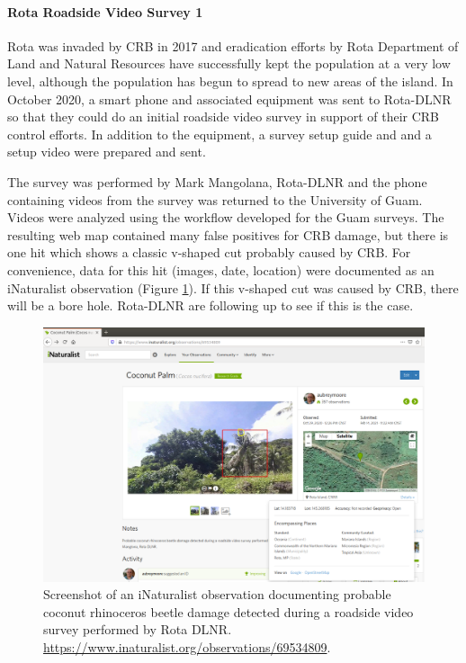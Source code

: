 \documentclass[12pt,letterpaper,english,bibliography=totocnumbered,abstract=on]{scrartcl}
\begin{document}
\clearpage
\paragraph{Rota Roadside Video Survey 1}

Rota was invaded by CRB in 2017 and eradication efforts by Rota Department of Land and Natural Resources have successfully kept the population at a very low level, although the population has begun to spread to new areas of the island. In October 2020, a smart phone and associated equipment was sent to Rota-DLNR so that they could do an initial roadside video survey in support of their CRB control efforts. In addition to the equipment, a survey setup guide and  \cite{aubreymooreSetAutomatedRoadside2020} and a setup video \cite{mooreYouTubeVideoMounting2020} were prepared and sent.

The survey was performed by Mark Mangolana, Rota-DLNR and the phone containing videos from the survey was returned to the University of Guam.  Videos were analyzed using the workflow developed for the Guam surveys. The resulting web map contained many false positives for CRB damage, but there is one hit which shows a classic v-shaped cut probably caused by CRB. For convenience, data for this hit (images, date, location) were documented as an iNaturalist observation (Figure \ref{fig:rota-inat-obs}). If this v-shaped cut was caused by CRB, there will be a bore hole. Rota-DLNR are following up to see if this is the case.


\begin{figure}[h]
	\centering
	\includegraphics[width=1\linewidth]{images/Rota-iNat-obs}
	\caption{Screenshot of an iNaturalist observation documenting probable coconut rhinoceros beetle damage detected during a roadside video survey performed by Rota DLNR. \url{https://www.inaturalist.org/observations/69534809}.}
	\label{fig:rota-inat-obs}
\end{figure}
\end{document}
